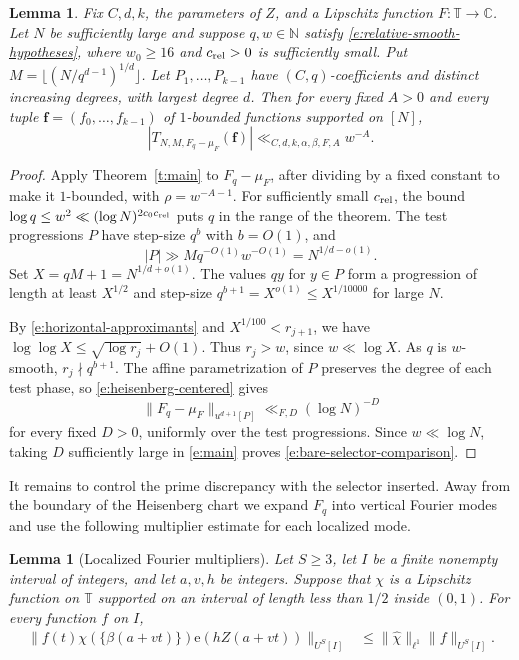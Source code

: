 \documentclass[12pt]{amsart}
\newcommand{\1}{\mathbf 1}
\newcommand{\e}{\mathrm e}
\newtheorem{lemma}[theorem]{Lemma}
\theoremstyle{definition}
\begin{document}
\begin{lemma}\label{l:unweighted-selector-relative-range}
Fix \(C,d,k\), the parameters of \(Z\), and a Lipschitz function
\(F:\mathbb T\to\mathbb C\). Let \(N\) be sufficiently large and
suppose \(q,w\in\mathbb N\) satisfy \eqref{e:relative-smooth-hypotheses},
where \(w_0\ge16\) and \(c_{\rm rel}>0\) is sufficiently small.
Put \(M=\lfloor(N/q^{d-1})^{1/d}\rfloor\). Let
\(P_1,\ldots,P_{k-1}\) have \((C,q)\)-coefficients and distinct
increasing degrees, with largest degree \(d\). Then for every
fixed \(A>0\) and every tuple \(\mathbf f=(f_0,\ldots,f_{k-1})\)
of \(1\)-bounded functions supported on \([N]\),
\begin{equation}\label{e:bare-selector-comparison}
 |T_{N,M,F_q-\mu_F}(\mathbf f)|\ll_{C,d,k,\alpha,\beta,F,A}w^{-A}.
\end{equation}
\end{lemma}

\begin{proof}
Apply Theorem~\ref{t:main} to \(F_q-\mu_F\), after dividing by a
fixed constant to make it \(1\)-bounded, with \(\rho=w^{-A-1}\).
For sufficiently small \(c_{\rm rel}\), the bound
\(\log q\le w^2\ll(\log N)^{2c_0c_{\rm rel}}\) puts \(q\) in the
range of the theorem. The test progressions \(P\) have step-size \(q^b\)
with \(b=O(1)\), and
\[
 |P|\gg Mq^{-O(1)}w^{-O(1)}=N^{1/d-o(1)}.
\]
Set \(X=qM+1=N^{1/d+o(1)}\). The values \(qy\) for \(y\in P\)
form a progression of length at least \(X^{1/2}\) and step-size
\(q^{b+1}=X^{o(1)}\le X^{1/10000}\) for large \(N\).

By \eqref{e:horizontal-approximants} and \(X^{1/100}<r_{j+1}\),
we have \(\log\log X\le\sqrt{\log r_j}+O(1)\). Thus \(r_j>w\),
since \(w\ll\log X\). As \(q\) is \(w\)-smooth, \(r_j\nmid q^{b+1}\).
The affine parametrization of \(P\) preserves the degree of each
test phase, so \eqref{e:heisenberg-centered} gives
\[
 \|F_q-\mu_F\|_{u^{d+1}[P]}\ll_{F,D}(\log N)^{-D}
\]
for every fixed \(D>0\), uniformly over the test progressions.
Since \(w\ll\log N\), taking \(D\) sufficiently large in
\eqref{e:main} proves \eqref{e:bare-selector-comparison}.
\end{proof}

It remains to control the prime discrepancy with the selector
inserted. Away from the boundary of the Heisenberg chart we
expand \(F_q\) into vertical Fourier modes and use the following
multiplier estimate for each localized mode.

\begin{lemma}[Localized Fourier multipliers]\label{l:vertical-mode-multiplier}
Let \(S\geq3\), let \(I\) be a finite nonempty interval of integers, and let
\(a,v,h\) be integers. Suppose that \(\chi\) is a Lipschitz function
on \(\mathbb T\) supported on an interval of length less than \(1/2\)
inside \((0,1)\). For every function \(f\) on \(I\),
\begin{align}
 \|f(t)\chi(\{\beta(a+vt)\})\e(hZ(a+vt))\|_{U^S[I]}
 &\leq\|\widehat\chi\|_{\ell^1}\|f\|_{U^S[I]}.
 \label{e:vertical-mode-multiplier}
\end{align}
\end{lemma}
\end{document}
